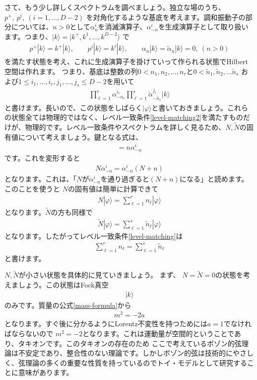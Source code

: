 \documentclass[report,paper=a4, fontsize=12pt, line_length=16cm, number_of_lines=34,dvipdfmx]{jlreq}
\numberwithin{equation}{chapter}
\numberwithin{equation}{section}
\newcommand{\alphat}{\tilde{\alpha}}
\newcommand{\Nt}{\widetilde{N}}
\begin{document}
さて、もう少し詳しくスペクトラムを調べましょう。独立な場のうち、$p^{+},\ p^{i},\ (i=1,\dots, D-2)$
を対角化するような基底を考えます。調和振動子の部分については、$n>0$として$\alpha_n^i$を消滅演算子、$\alpha_{-n}^i$を生成演算子として取り扱います。つまり、$|k\rangle=|k^+,k^1,\dots,k^{D-2}\rangle$ で
\begin{align}
p^{+}|k\rangle=k^{+}|k\rangle,\qquad
p^{i}|k\rangle=k^{i}|k\rangle,\qquad
\alpha_n|k\rangle=\alphat_n|k\rangle=0,\ (n>0)
\end{align}
を満たす状態を考え、これに生成演算子を掛けていって作られる状態でHilbert空間は作れます。
つまり、基底は整数の列$0<n_1,n_2, \dots, n_{r}$と$0<\tilde n_1, \tilde n_2, \dots \tilde n_{s}$
および$1 \le i_1,\dots,i_r,j_1,\dots,j_s\le D-2$を用いて
\begin{align}
\prod_{\ell=1}^{r}\alpha_{-n_{\ell}}^{i_{\ell}} \prod_{\ell=1}^{s}\alphat_{-\tilde n_{\ell}}^{j_{\ell}}|k\rangle
\end{align}
と書けます。長いので、この状態をしばらく$|\varphi\rangle$と書いておきましょう。これらの状態全ては物理的ではなく、レベル一致条件\eqref{level-matching2}を満たすものだけが、物理的です。レベル一致条件やスペクトラムを詳しく見るため、$N,\Nt$の固有値について考えましょう。鍵となる式は、
\begin{align}
[N,\alpha^i_{-n}]=n\alpha^i_{-n}
\end{align}
です。これを変形すると
\begin{align}
N\alpha^i_{-n}=\alpha^i_{-n}(N+n)
\end{align}
となります。これは、「$N$が$\alpha^i_{-n}$を通り過ぎると$(N+n)$になる」と読めます。このことを使うと
$N$の固有値は簡単に計算できて
\begin{align}
N|\varphi\rangle=\sum_{\ell=1}^{r}n_{\ell}|\varphi\rangle
\end{align}
となります。$\Nt$の方も同様で
\begin{align}
\Nt|\varphi\rangle=\sum_{\ell=1}^{s}\tilde n_{\ell}|\varphi\rangle
\end{align}
となります。したがってレベル一致条件\eqref{level-matching}は
\begin{align}
\sum_{\ell=1}^{r}n_{\ell}=\sum_{\ell=1}^{s}\tilde n_{\ell}
\end{align}
と書けます。

$N,\Nt$が小さい状態を具体的に見ていきましょう。
まず、 $N=\Nt=0$の状態を考えましょう。この状態はFock真空
\begin{align}
 |k\rangle
\end{align}
のみです。質量の公式\eqref{mass-formula}から
\begin{align}
m^2=-2a
\end{align}
となります。すぐ後に分かるようにLorentz不変性を持つためには$a=1$でなければならないので
$m^2=-2$となります。これは運動量が空間的ということであり、タキオンです。このタキオンの存在のため
ここで考えているボゾン的弦理論は不安定であり、整合性のない理論です。しかしボゾン的弦は技術的にやさしく、弦理論の多くの重要な性質を持っているのでトイ・モデルとして研究することに意味があります。
\end{document}
